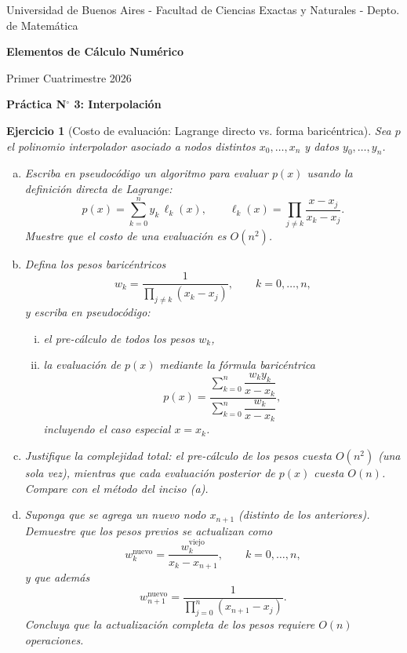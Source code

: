 \documentclass[12pt]{article}
\newtheorem{exercise}{Ejercicio}
\begin{document}
\centerline{{\small Universidad de Buenos Aires - Facultad de Ciencias Exactas y Naturales - Depto. de Matemática}}
 
 \vskip 0.2cm
 \hrulefill
 \vskip 0.2cm

 \centerline{{\bf\Huge {\sc Elementos de Cálculo Numérico}}}
 \vskip 0.2cm
 \centerline{\ttfamily Primer Cuatrimestre 2026}
 \hrulefill

 \bigskip
 \centerline{\bf Práctica N$^\circ$ 3: Interpolación}
 \bigskip

\begin{exercise}[Costo de evaluación: Lagrange directo vs. forma baricéntrica]
Sea $p$ el polinomio interpolador asociado a nodos distintos $x_0,\ldots,x_n$ y datos $y_0,\ldots,y_n$.
\begin{enumerate}[(a)]
\item Escriba en pseudocódigo un algoritmo para evaluar $p(x)$ usando la definición directa de Lagrange:
\[
p(x)=\sum_{k=0}^{n} y_k\,\ell_k(x), \qquad
\ell_k(x)=\prod_{j\ne k}\frac{x-x_j}{x_k-x_j}.
\]
Muestre que el costo de una evaluación es $O(n^2)$.

\item Defina los pesos baricéntricos
\[
w_k=\frac{1}{\prod_{j\ne k}(x_k-x_j)},\qquad k=0,\ldots,n,
\]
y escriba en pseudocódigo:
\begin{enumerate}[i.]
\item el pre-cálculo de todos los pesos $w_k$,
\item la evaluación de $p(x)$ mediante la fórmula baricéntrica
\[
p(x)=\frac{\sum_{k=0}^{n}\dfrac{w_k y_k}{x-x_k}}{\sum_{k=0}^{n}\dfrac{w_k}{x-x_k}},
\]
incluyendo el caso especial $x=x_k$.
\end{enumerate}

\item Justifique la complejidad total: el pre-cálculo de los pesos cuesta $O(n^2)$ (una sola vez), mientras que cada evaluación posterior de $p(x)$ cuesta $O(n)$. Compare con el método del inciso (a).

\item Suponga que se agrega un nuevo nodo $x_{n+1}$ (distinto de los anteriores). Demuestre que los pesos previos se actualizan como
\[
w_k^{\mathrm{nuevo}}=\frac{w_k^{\mathrm{viejo}}}{x_k-x_{n+1}},\qquad k=0,\ldots,n,
\]
y que además
\[
w_{n+1}^{\mathrm{nuevo}}=\frac{1}{\prod_{j=0}^{n}(x_{n+1}-x_j)}.
\]
Concluya que la actualización completa de los pesos requiere $O(n)$ operaciones.
\end{enumerate}
\end{exercise}
\end{document}
